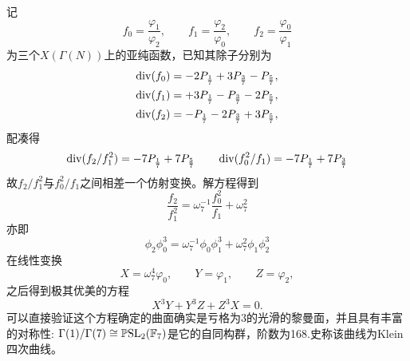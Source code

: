 记$$f_0=\frac{\varphi_1}{\varphi_2}, \qquad f_1=\frac{\varphi_2}{\varphi_0}, \qquad f_2=\frac{\varphi_0}{\varphi_1}$$
为三个$X(\Gamma(N))$上的亚纯函数，已知其除子分别为
\begin{equation*}
\begin{aligned}
\operatorname{\operatorname{div}} (f_0)=-2P_{\frac{1}{7}}+3P_{\frac{3}{7}}-P_{\frac{5}{7}},\\
\operatorname{\operatorname{div}} (f_1)=+3P_{\frac{1}{7}}-P_{\frac{3}{7}}-2P_{\frac{5}{7}},\\
\operatorname{\operatorname{div}} (f_2)=-P_{\frac{1}{7}}-2P_{\frac{3}{7}}+3P_{\frac{5}{7}},
\end{aligned}
\end{equation*}
配凑得
$$\operatorname{\operatorname{div}}(f_2/f_1^2)=-7P_{\frac{1}{7}}+7P_{\frac{5}{7}} \qquad \operatorname{\operatorname{div}}(f_0^2/f_1)=-7P_{\frac{1}{7}}+7P_{\frac{3}{7}}$$
故$f_2/f_1^2$与$f_0^2/f_1$之间相差一个仿射变换。解方程得到
$$\frac{f_2}{f_1^2}= \omega_7^{-1}\frac{f_0^2}{f_1}+\omega_7^2$$
亦即
$$\phi_2\phi_0^3=\omega_7^{-1}\phi_0\phi_1^3 +\omega_7^{2}\phi_1\phi_2^3$$
在线性变换
$$X=\omega_7^4\varphi_0, \qquad Y=\varphi_1, \qquad Z= \varphi_2,$$之后得到极其优美的方程$$X^3Y+Y^3Z+Z^3X=0.$$可以直接验证这个方程确定的曲面确实是亏格为$3$的光滑的黎曼面，并且具有丰富的对称性: $\Gamma(1)/\Gamma(7) \cong \operatorname{\mathbb{P}SL}_2(\mathbb{F}_7)$是它的自同构群，阶数为168.史称该曲线为Klein四次曲线。
\nocite{nash2014klein}\nocite{hilton1991catalan}\nocite{duke2005continued}
\nocite{green1978on}\nocite{klein1892vorlesungen}\nocite{fricke1897vorlesungen}\nocite{shimura1971introduction}\nocite{shurman1997geometry}\nocite{anvari2009automorphisms}\nocite{mumford1995algebraic}
\nocite{maier2008rationally}
%
%
